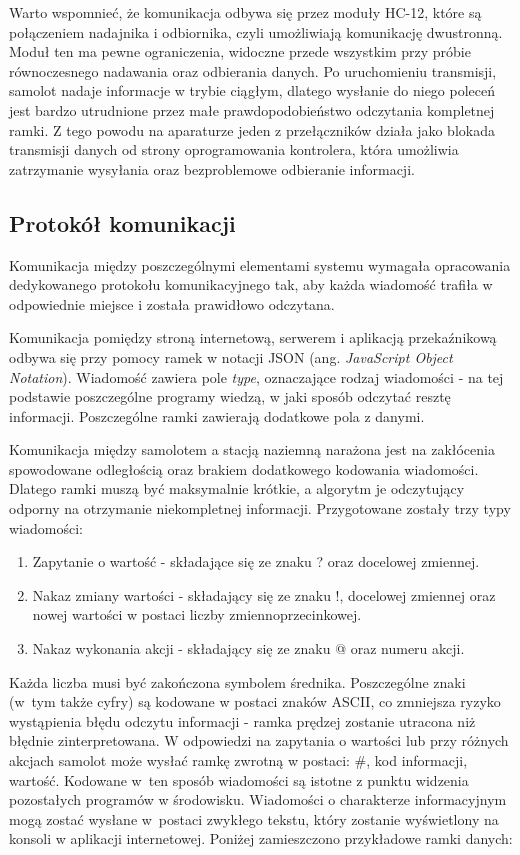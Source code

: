 \documentclass[12pt, a4paper]{article}
\begin{document}
Warto wspomnieć, że komunikacja odbywa się przez moduły HC-12, które są połączeniem nadajnika i odbiornika, czyli umożliwiają komunikację dwustronną. Moduł ten ma pewne ograniczenia, widoczne przede wszystkim przy próbie równoczesnego nadawania oraz odbierania danych. Po uruchomieniu transmisji, samolot nadaje informacje w trybie ciągłym, dlatego wysłanie do niego poleceń jest bardzo utrudnione przez małe prawdopodobieństwo odczytania kompletnej ramki. Z tego powodu na aparaturze jeden z przełączników działa jako blokada transmisji danych od strony oprogramowania kontrolera, która umożliwia zatrzymanie wysyłania oraz bezproblemowe odbieranie informacji.

\FloatBarrier
\subsection{Protokół komunikacji}
Komunikacja między poszczególnymi elementami systemu wymagała opracowania dedykowanego protokołu komunikacyjnego tak, aby każda wiadomość trafiła w odpowiednie miejsce i została prawidłowo odczytana. 

Komunikacja pomiędzy stroną internetową, serwerem i aplikacją przekaźnikową odbywa się przy pomocy ramek w notacji JSON (ang. \textit{JavaScript Object Notation}). Wiadomość zawiera pole \textit{type}, oznaczające rodzaj wiadomości - na tej podstawie poszczególne programy wiedzą, w jaki sposób odczytać resztę informacji. Poszczególne ramki zawierają dodatkowe pola z danymi. 

Komunikacja między samolotem a stacją naziemną narażona jest na zakłócenia spowodowane odległością oraz brakiem dodatkowego kodowania wiadomości. Dlatego ramki muszą być maksymalnie krótkie, a algorytm je odczytujący odporny na otrzymanie niekompletnej informacji. Przygotowane zostały trzy typy wiadomości:

\begin{enumerate}
	\item Zapytanie o wartość - składające się ze znaku ? oraz docelowej zmiennej.
	\item Nakaz zmiany wartości - składający się ze znaku !, docelowej zmiennej oraz nowej wartości w postaci liczby zmiennoprzecinkowej.
	\item Nakaz wykonania akcji - składający się ze znaku @ oraz numeru akcji.	
\end{enumerate}

Każda liczba musi być zakończona symbolem średnika. Poszczególne znaki (w~tym także cyfry) są kodowane w postaci znaków ASCII, co zmniejsza ryzyko wystąpienia błędu odczytu informacji - ramka prędzej zostanie utracona niż błędnie zinterpretowana. W odpowiedzi na zapytania o wartości lub przy różnych akcjach samolot może wysłać ramkę zwrotną w postaci: \#, kod informacji, wartość. Kodowane w~ten sposób wiadomości są istotne z punktu widzenia pozostałych programów w środowisku. Wiadomości o charakterze informacyjnym mogą zostać wysłane w~postaci zwykłego tekstu, który zostanie wyświetlony na konsoli w aplikacji internetowej. Poniżej zamieszczono przykładowe ramki danych: 
\end{document}
